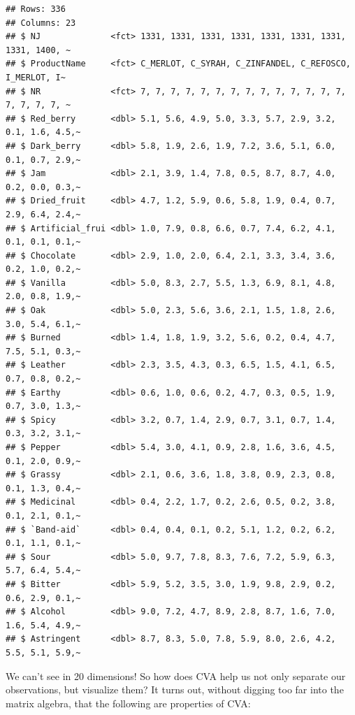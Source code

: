 \documentclass[
]{book}
\begin{document}
\begin{verbatim}
## Rows: 336
## Columns: 23
## $ NJ              <fct> 1331, 1331, 1331, 1331, 1331, 1331, 1331, 1331, 1400, ~
## $ ProductName     <fct> C_MERLOT, C_SYRAH, C_ZINFANDEL, C_REFOSCO, I_MERLOT, I~
## $ NR              <fct> 7, 7, 7, 7, 7, 7, 7, 7, 7, 7, 7, 7, 7, 7, 7, 7, 7, 7, ~
## $ Red_berry       <dbl> 5.1, 5.6, 4.9, 5.0, 3.3, 5.7, 2.9, 3.2, 0.1, 1.6, 4.5,~
## $ Dark_berry      <dbl> 5.8, 1.9, 2.6, 1.9, 7.2, 3.6, 5.1, 6.0, 0.1, 0.7, 2.9,~
## $ Jam             <dbl> 2.1, 3.9, 1.4, 7.8, 0.5, 8.7, 8.7, 4.0, 0.2, 0.0, 0.3,~
## $ Dried_fruit     <dbl> 4.7, 1.2, 5.9, 0.6, 5.8, 1.9, 0.4, 0.7, 2.9, 6.4, 2.4,~
## $ Artificial_frui <dbl> 1.0, 7.9, 0.8, 6.6, 0.7, 7.4, 6.2, 4.1, 0.1, 0.1, 0.1,~
## $ Chocolate       <dbl> 2.9, 1.0, 2.0, 6.4, 2.1, 3.3, 3.4, 3.6, 0.2, 1.0, 0.2,~
## $ Vanilla         <dbl> 5.0, 8.3, 2.7, 5.5, 1.3, 6.9, 8.1, 4.8, 2.0, 0.8, 1.9,~
## $ Oak             <dbl> 5.0, 2.3, 5.6, 3.6, 2.1, 1.5, 1.8, 2.6, 3.0, 5.4, 6.1,~
## $ Burned          <dbl> 1.4, 1.8, 1.9, 3.2, 5.6, 0.2, 0.4, 4.7, 7.5, 5.1, 0.3,~
## $ Leather         <dbl> 2.3, 3.5, 4.3, 0.3, 6.5, 1.5, 4.1, 6.5, 0.7, 0.8, 0.2,~
## $ Earthy          <dbl> 0.6, 1.0, 0.6, 0.2, 4.7, 0.3, 0.5, 1.9, 0.7, 3.0, 1.3,~
## $ Spicy           <dbl> 3.2, 0.7, 1.4, 2.9, 0.7, 3.1, 0.7, 1.4, 0.3, 3.2, 3.1,~
## $ Pepper          <dbl> 5.4, 3.0, 4.1, 0.9, 2.8, 1.6, 3.6, 4.5, 0.1, 2.0, 0.9,~
## $ Grassy          <dbl> 2.1, 0.6, 3.6, 1.8, 3.8, 0.9, 2.3, 0.8, 0.1, 1.3, 0.4,~
## $ Medicinal       <dbl> 0.4, 2.2, 1.7, 0.2, 2.6, 0.5, 0.2, 3.8, 0.1, 2.1, 0.1,~
## $ `Band-aid`      <dbl> 0.4, 0.4, 0.1, 0.2, 5.1, 1.2, 0.2, 6.2, 0.1, 1.1, 0.1,~
## $ Sour            <dbl> 5.0, 9.7, 7.8, 8.3, 7.6, 7.2, 5.9, 6.3, 5.7, 6.4, 5.4,~
## $ Bitter          <dbl> 5.9, 5.2, 3.5, 3.0, 1.9, 9.8, 2.9, 0.2, 0.6, 2.9, 0.1,~
## $ Alcohol         <dbl> 9.0, 7.2, 4.7, 8.9, 2.8, 8.7, 1.6, 7.0, 1.6, 5.4, 4.9,~
## $ Astringent      <dbl> 8.7, 8.3, 5.0, 7.8, 5.9, 8.0, 2.6, 4.2, 5.5, 5.1, 5.9,~
\end{verbatim}

We can't see in 20 dimensions! So how does CVA help us not only separate our observations, but visualize them? It turns out, without digging too far into the matrix algebra, that the following are properties of CVA:
\end{document}
